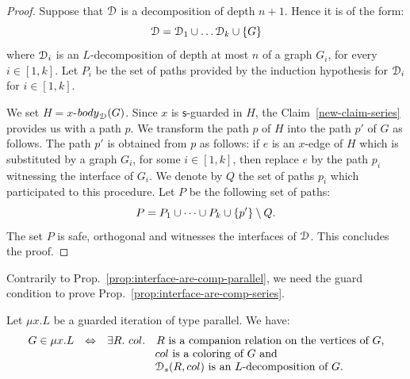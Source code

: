 \begin{proof}
 Suppose that $\mathcal D$ is a decomposition of depth $n+1$. Hence it is of the form: 
$$\mathcal D=\mathcal D_1\cup\dots\mathcal D_k\cup\left\{G\right\}$$ 
where $\mathcal D_i$ is an $L$-decomposition of depth at most $n$ of a graph $G_i$, for every $i\in[1,k]$. Let $P_i$ be the set of paths provided by the induction hypothesis for $\mathcal D_i$ for $i\in[1,k]$.
\medskip

We set $H=x$-$\mathsf{body}_\cD(G)$.  Since $x$ is $\mathsf{s}$-guarded in $H$, the Claim~\ref{new-claim-series} provides us with a path $p$. We transform the path $p$ of $H$ into the path $p'$ of $G$ as follows. The path $p'$ is obtained from $p$ as follows: if $e$ is an $x$-edge of $H$ which is substituted by a graph $G_i$, for some $i\in [1,k]$, then replace $e$ by the path $p_i$ witnessing the interface of $G_i$. We denote by $Q$ the set of paths $p_i$ which participated to this procedure. 
 Let $P$ be the following set of paths: $$P=P_1\cup\dots \cup P_k\cup\left\{p'\right\}\setminus Q.$$
 The set $P$ is safe, orthogonal and witnesses the interfaces of $\mathcal D$.  This concludes the proof.

\end{proof}
\begin{remark}
Contrarily to Prop.~\ref{prop:interface-are-comp-parallel}, we need the guard condition to prove Prop.~\ref{prop:interface-are-comp-series}.
\end{remark}

\begin{corollary}\label{cor:decomp-iteration-series}
Let  $\mu x. L$ be a guarded iteration of type parallel. We have:
$$\begin{array}{rll}
  G\in \mu x. L& \Leftrightarrow& \exists R.\ \col. \quad  R \text{ is a companion relation on the vertices of $G$,}\\
                        &             & \qquad\qquad\   \col \text{ is a coloring of $G$ and } \\
                      &             & \qquad\qquad\   \cD_\mathsf{s}(R,\col) \text{ is an $L$-decomposition of $G$.} 
\end{array}
$$
\end{corollary}

